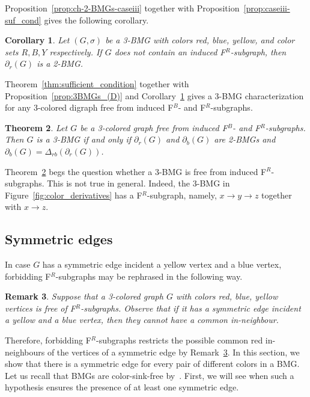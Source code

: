 \documentclass[final,3p,times]{elsarticle}
\newtheorem{theorem}{Theorem}[section]
\newtheorem{corollary}[theorem]{Corollary}%
\newtheorem{remark}[theorem]{Remark}%
\begin{document}
Proposition~\ref{prop:ch-2-BMGs-caseiii} together with Proposition~\ref{prop:caseiii-suf_cond} gives the following corollary.

\begin{corollary}
\label{cor:2BMGsD-forbidden}
Let $(G,\sigma)$ be a 3-BMG with colors red, blue, yellow, and color sets $R,B,Y$ respectively. If $G$ does not contain an induced F$^R$-subgraph, then $\partial_r(G)$ is a 2-BMG.
\end{corollary}

Theorem~\ref{thm:sufficient_condition} together with Proposition~\ref{prop:3BMGs_(D)} and Corollary~\ref{cor:2BMGsD-forbidden} gives a 3-BMG characterization for any 3-colored digraph free from induced F$^B$- and F$^R$-subgraphs.

\begin{theorem}\label{thm:characterization3BMG_forbidden}
Let $G$ be a 3-colored graph free from induced F$^B$- and F$^R$-subgraphs. Then $G$ is a 3-BMG if and only if $\partial_{r}(G)$ and $\partial_{b}(G)$ are 2-BMGs and $\partial_b(G)=\Delta_{rb}(\partial_r(G))$.
\end{theorem}

Theorem~\ref{thm:characterization3BMG_forbidden} begs the question whether a 3-BMG is free from induced F$^R$-subgraphs. This is not true in general. Indeed, the 3-BMG in Figure~\ref{fig:color_derivatives} has a F$^R$-subgraph, namely, $x \rightarrow y \rightarrow z$ together with $x\rightarrow z$.

\subsection{Symmetric edges}\label{sec:sym_edges}
In case $G$ has a symmetric edge incident a yellow vertex and a blue vertex, forbidding F$^R$-subgraphs may be rephrased in the following way.

\begin{remark}\label{rmk:sym_F^R}
Suppose that a 3-colored graph $G$ with colors red, blue, yellow vertices is free of F$^R$-subgraphs. Observe that if it has a symmetric edge incident a yellow and a blue vertex, then they cannot have a common in-neighbour. 
\end{remark}

Therefore, forbidding F$^R$-subgraphs restricts the possible common red in-neighbours of the vertices of a symmetric edge by Remark~\ref{rmk:sym_F^R}. In this section, we show that there is a symmetric edge for every pair of different colors in a BMG. Let us recall that BMGs are color-sink-free by~\cite[Proposition~2.3]{korchmaros2021quasi}. First, we will see when such a hypothesis ensures the presence of at least one symmetric edge. 
\end{document}
